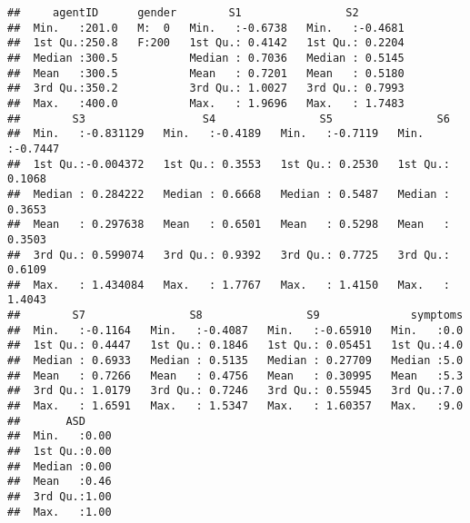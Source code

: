 \documentclass[]{article}
\newenvironment{Shaded}{\begin{snugshade}}{\end{snugshade}}
\newcommand{\KeywordTok}[1]{\textcolor[rgb]{0.13,0.29,0.53}{\textbf{#1}}}
\newcommand{\DecValTok}[1]{\textcolor[rgb]{0.00,0.00,0.81}{#1}}
\newcommand{\StringTok}[1]{\textcolor[rgb]{0.31,0.60,0.02}{#1}}
\newcommand{\CommentTok}[1]{\textcolor[rgb]{0.56,0.35,0.01}{\textit{#1}}}
\newcommand{\OperatorTok}[1]{\textcolor[rgb]{0.81,0.36,0.00}{\textbf{#1}}}
\newcommand{\NormalTok}[1]{#1}
\begin{document}
\begin{verbatim}
##     agentID      gender        S1                S2         
##  Min.   :201.0   M:  0   Min.   :-0.6738   Min.   :-0.4681  
##  1st Qu.:250.8   F:200   1st Qu.: 0.4142   1st Qu.: 0.2204  
##  Median :300.5           Median : 0.7036   Median : 0.5145  
##  Mean   :300.5           Mean   : 0.7201   Mean   : 0.5180  
##  3rd Qu.:350.2           3rd Qu.: 1.0027   3rd Qu.: 0.7993  
##  Max.   :400.0           Max.   : 1.9696   Max.   : 1.7483  
##        S3                  S4                S5                S6         
##  Min.   :-0.831129   Min.   :-0.4189   Min.   :-0.7119   Min.   :-0.7447  
##  1st Qu.:-0.004372   1st Qu.: 0.3553   1st Qu.: 0.2530   1st Qu.: 0.1068  
##  Median : 0.284222   Median : 0.6668   Median : 0.5487   Median : 0.3653  
##  Mean   : 0.297638   Mean   : 0.6501   Mean   : 0.5298   Mean   : 0.3503  
##  3rd Qu.: 0.599074   3rd Qu.: 0.9392   3rd Qu.: 0.7725   3rd Qu.: 0.6109  
##  Max.   : 1.434084   Max.   : 1.7767   Max.   : 1.4150   Max.   : 1.4043  
##        S7                S8                S9              symptoms  
##  Min.   :-0.1164   Min.   :-0.4087   Min.   :-0.65910   Min.   :0.0  
##  1st Qu.: 0.4447   1st Qu.: 0.1846   1st Qu.: 0.05451   1st Qu.:4.0  
##  Median : 0.6933   Median : 0.5135   Median : 0.27709   Median :5.0  
##  Mean   : 0.7266   Mean   : 0.4756   Mean   : 0.30995   Mean   :5.3  
##  3rd Qu.: 1.0179   3rd Qu.: 0.7246   3rd Qu.: 0.55945   3rd Qu.:7.0  
##  Max.   : 1.6591   Max.   : 1.5347   Max.   : 1.60357   Max.   :9.0  
##       ASD      
##  Min.   :0.00  
##  1st Qu.:0.00  
##  Median :0.00  
##  Mean   :0.46  
##  3rd Qu.:1.00  
##  Max.   :1.00
\end{verbatim}

\begin{Shaded}
\end{Shaded}
\end{document}

